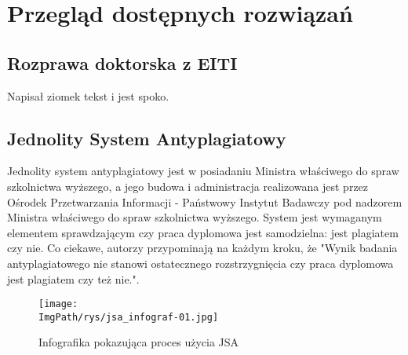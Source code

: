 \documentclass[a4paper,12pt,twoside,openany]{report}
\newcommand{\ImgPath}{.}
\begin{document}
\chapter{Przegląd dostępnych rozwiązań}

\section{Rozprawa doktorska z EITI}
Napisał ziomek tekst i jest spoko.

\section{Jednolity System Antyplagiatowy}
Jednolity system antyplagiatowy jest w posiadaniu Ministra właściwego do spraw szkolnictwa wyższego, a jego budowa i administracja realizowana jest przez Ośrodek Przetwarzania Informacji - Państwowy Instytut Badawczy pod nadzorem Ministra właściwego do spraw szkolnictwa wyższego. System jest wymaganym elementem sprawdzającym czy praca dyplomowa jest samodzielna: jest plagiatem czy nie. 
Co ciekawe, autorzy przypominają na każdym kroku, że "Wynik badania antyplagiatowego nie stanowi ostatecznego rozstrzygnięcia czy praca dyplomowa jest plagiatem czy też nie.". 

\begin{figure}[!htbp]
	\begin{center}
		\centering
		\texttt{[image: \\ImgPath/rys/jsa\_infograf-01.jpg]}
	\end{center}
	\caption{Infografika pokazująca proces użycia JSA}
\end{figure}
\end{document}
